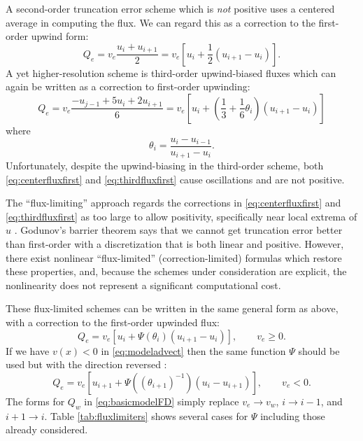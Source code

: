 \documentclass[11pt,final]{amsart}
\begin{document}
A second-order truncation error scheme which is \emph{not} positive uses a centered average in computing the flux.  We can regard this as a correction to the first-order upwind form:
\begin{equation}
Q_e = v_e \frac{u_i+u_{i+1}}{2} = v_e \left[u_i + \frac{1}{2} (u_{i+1} - u_i)\right]. \label{eq:centerfluxfirst}
\end{equation}
A yet higher-resolution scheme is third-order upwind-biased fluxes which can again be written as a correction to first-order upwinding:
\begin{equation}
Q_e = v_e \frac{-u_{j-1} + 5 u_i + 2 u_{i+1}}{6} = v_e \left[u_i + \left(\frac{1}{3}+\frac{1}{6} \theta_i \right) (u_{i+1} - u_i)\right] \label{eq:thirdfluxfirst}
\end{equation}
where
\begin{equation}
\theta_i = \frac{u_{i} - u_{i-1}}{u_{i+1} - u_i}.  \label{eq:thetadefine}
\end{equation}
Unfortunately, despite the upwind-biasing in the third-order scheme, both \eqref{eq:centerfluxfirst} and \eqref{eq:thirdfluxfirst} cause oscillations and are not positive.

The ``flux-limiting'' approach regards the corrections in \eqref{eq:centerfluxfirst} and \eqref{eq:thirdfluxfirst} as too large to allow positivity, specifically near local extrema of $u$ \citep[section III.1.1]{HundsdorferVerwer2010}.  Godunov's barrier theorem \citep[section I.7.1]{HundsdorferVerwer2010} says that we cannot get truncation error better than first-order with a discretization that is both linear and positive.  However, there exist nonlinear ``flux-limited'' (correction-limited) formulas which restore these properties, and, because the schemes under consideration are explicit, the nonlinearity does not represent a significant computational cost.

These flux-limited schemes can be written in the same general form as above, with a correction to the first-order upwinded flux:
\begin{equation}
Q_e = v_e \left[u_i + \Psi(\theta_i) (u_{i+1} - u_i)\right], \qquad v_e \ge 0. \label{eq:fluxlimiterform}
\end{equation}
If we have $v(x)<0$ in \eqref{eq:modeladvect} then the same function $\Psi$ should be used but with the direction reversed \citep[section III.1.1]{HundsdorferVerwer2010}:
\begin{equation}
Q_e = v_e \left[u_{i+1} + \Psi\left((\theta_{i+1})^{-1}\right) (u_i - u_{i+1})\right], \qquad v_e < 0. \label{eq:fluxlimiterformreversed}
\end{equation}
The forms for $Q_w$ in \eqref{eq:basicmodelFD} simply replace $v_e \to v_w$, $i\to i-1$, and $i+1\to i$.  Table \ref{tab:fluxlimiters} shows several cases for $\Psi$ including those already considered.
\end{document}
